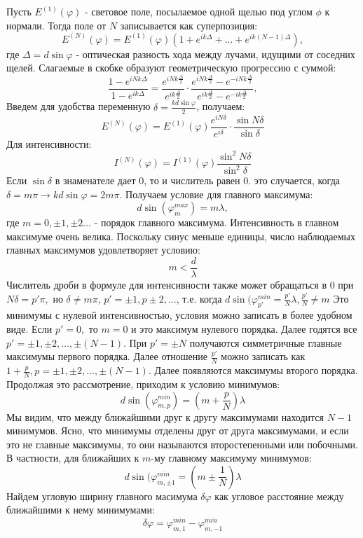 \documentclass[__main__.tex]{subfiles}
\begin{document}
Пусть $E^{(1)} (\varphi)$ - световое поле, посылаемое одной щелью под углом $\phi$ к нормали. Тогда поле от $N$ записывается как суперпозиция:
$$E^{(N)}(\varphi) = E^{(1)}(\varphi)(1 + e^{ik\Delta} + ... + e^{ik(N-1)\Delta}),$$
где $\Delta = d\sin \varphi$ - оптическая разность хода между лучами, идущими от соседних щелей. Слагаемые в скобке образуют геометрическую прогрессию с суммой:
$$\frac{1-e^{iNk\Delta}}{1-e^{ik\Delta}} = \frac{e^{iNk\frac{\Delta}{2}}}{e^{ik\frac{\Delta}{2}}}\cdot \frac{e^{iNk\frac{\Delta}{2}} - e^{-iNk\frac{\Delta}{2}}}{e^{ik\frac{\Delta}{2}} - e^{-ik\frac{\Delta}{2}}},$$
Введем для удобства переменную $\delta = \frac{kd\sin\varphi}{2}$, получаем:
$$E^{(N)}(\varphi) = E^{(1)}(\varphi)\frac{e^{iN\delta}}{e^{i\delta}}\cdot \frac{\sin N\delta}{\sin\delta}$$
Для интенсивности:
$$I^{(N)}(\varphi) = I^{(1)}(\varphi)\frac{\sin^2 N\delta}{\sin^2\delta}$$
Если $\sin \delta$ в знаменателе дает 0, то и числитель равен 0. это случается, когда $\delta = m\pi \rightarrow kd\sin\varphi = 2m\pi$. Получаем условие для главного максимума:
$$d\sin(\varphi^{max}_m) = m\lambda,$$
где $m = 0, \pm 1, \pm 2...$ - порядок главного максимума. Интенсивность в главном максимуме очень велика. Поскольку синус меньше единицы, число наблюдаемых главных максимумов удовлетворяет условию:
$$m < \frac{d}{\lambda}$$
Числитель дроби в формуле для интенсивности также может обращаться в 0 при $N\delta = p'\pi, $ но $\delta \neq m\pi$, $p' = \pm 1, p\pm 2, ...$, т.е. когда $d\sin(\varphi ^{min}_{p'} = \frac{p'}{N}\lambda, \frac{p'}{N} \neq m$  
Это минимумы с нулевой интенсивностью, условия можно записать в более удобном виде. Если $p' = 0, $ то $m = 0$ и это максимум нулевого порядка. Далее годятся все $p' = \pm1, \pm2, ... , \pm(N-1). $ При $p' = \pm N$ получаются симметричные главные максимумы первого порядка. Далее отношение $\frac{p'}{N}$ можно записать как $1 + \frac{p}{N}, p =  \pm1, \pm2, ... , \pm(N-1)$. Далее появляются максимумы второго порядка. Продолжая это рассмотрение, приходим к условию минимумов:
$$d \sin(\varphi^{min}_{m, p}) = (m + \frac{p}{N})\lambda$$
Мы видим, что между ближайшими друг к другу максимумами находится $N - 1$ минимумов. Ясно, что минимумы отделены друг от друга максимумами, и если это не главные максимумы, то они называются второстепенными или побочными. В частности, для ближайших к $m$-му главному максимуму минимумов:
$$d\sin(\varphi^{min}_{m, \pm1} = (m \pm \frac{1}{N})\lambda$$
Найдем угловую ширину главного масимума $\delta\varphi$ как угловое расстояние между ближайшими к нему минимумами:
$$\delta\varphi = \varphi^{min}_{m, 1} - \varphi^{min}_{m, -1} $$
\end{document}
